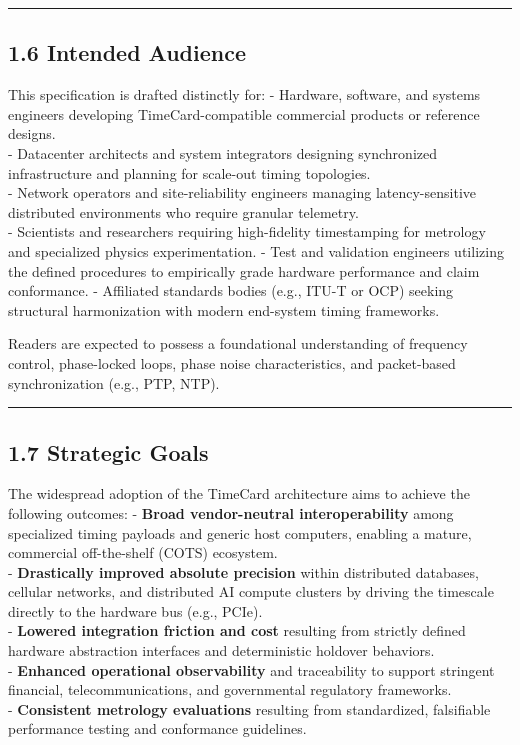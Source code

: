 \documentclass[
]{article}
\begin{document}
\begin{center}\rule{0.5\linewidth}{0.5pt}\end{center}

\subsection{1.6 Intended Audience}\label{intended-audience}

This specification is drafted distinctly for: - Hardware, software, and
systems engineers developing TimeCard-compatible commercial products or
reference designs.\\
- Datacenter architects and system integrators designing synchronized
infrastructure and planning for scale-out timing topologies.\\
- Network operators and site-reliability engineers managing
latency-sensitive distributed environments who require granular
telemetry.\\
- Scientists and researchers requiring high-fidelity timestamping for
metrology and specialized physics experimentation. - Test and validation
engineers utilizing the defined procedures to empirically grade hardware
performance and claim conformance. - Affiliated standards bodies (e.g.,
ITU-T or OCP) seeking structural harmonization with modern end-system
timing frameworks.

Readers are expected to possess a foundational understanding of
frequency control, phase-locked loops, phase noise characteristics, and
packet-based synchronization (e.g., PTP, NTP).

\begin{center}\rule{0.5\linewidth}{0.5pt}\end{center}

\subsection{1.7 Strategic Goals}\label{strategic-goals}

The widespread adoption of the TimeCard architecture aims to achieve the
following outcomes: - \textbf{Broad vendor-neutral interoperability}
among specialized timing payloads and generic host computers, enabling a
mature, commercial off-the-shelf (COTS) ecosystem.\\
- \textbf{Drastically improved absolute precision} within distributed
databases, cellular networks, and distributed AI compute clusters by
driving the timescale directly to the hardware bus (e.g., PCIe).\\
- \textbf{Lowered integration friction and cost} resulting from strictly
defined hardware abstraction interfaces and deterministic holdover
behaviors.\\
- \textbf{Enhanced operational observability} and traceability to
support stringent financial, telecommunications, and governmental
regulatory frameworks.\\
- \textbf{Consistent metrology evaluations} resulting from standardized,
falsifiable performance testing and conformance guidelines.
\end{document}
